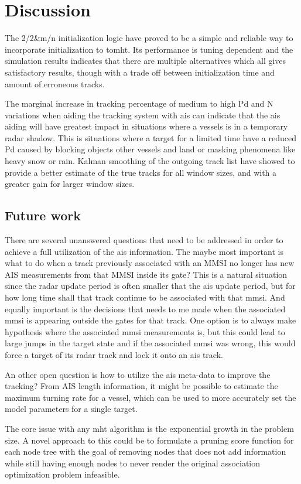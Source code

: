
\chapter{Discussion}\label{chapter:discussion}
The 2/2\&m/n initialization logic have proved to be a simple and reliable way to incorporate initialization to \gls{tomht}. Its performance is tuning dependent and the simulation results indicates that there are multiple alternatives which all gives satisfactory results, though with a trade off between initialization time and amount of erroneous tracks.

The marginal increase in tracking percentage of medium to high \gls{Pd} and N variations when aiding the tracking system with \gls{ais} can indicate that the \gls{ais} aiding will have greatest impact in situations where a vessels is in a temporary radar shadow. This is situations where a target for a limited time have a reduced \gls{Pd} caused by blocking objects other vessels and land or masking phenomena like heavy snow or rain. Kalman smoothing of the outgoing track list have showed to provide a better estimate of the true tracks for all window sizes, and with a greater gain for larger window sizes. 



\section{Future work}\label{sec:future-work}
There are several unanswered questions that need to be addressed in order to achieve a full utilization of the \gls{ais} information. The maybe most important is what to do when a track previously associated with an MMSI no longer has new AIS measurements from that MMSI inside its gate? This is a natural situation since the radar update period is often smaller that the \gls{ais} update period, but for how long time shall that track continue to be associated with that \gls{mmsi}. And equally important is the decisions that needs to me made when the associated \gls{mmsi} is appearing outside the gates for that track. One option is to always make hypothesis where the associated \gls{mmsi} measurements is, but this could lead to large jumps in the target state and if the associated \gls{mmsi} was wrong, this would force a target of its radar track and lock it onto an \gls{ais} track.

An other open question is how to utilize the \gls{ais} meta-data to improve the tracking? From AIS length information, it might be possible to estimate the maximum turning rate for a vessel, which can be used to more accurately set the model parameters for a single target.

The core issue with any \gls{mht} algorithm is the exponential growth in the problem size. A novel approach to this could be to formulate a pruning score function for each node tree with the goal of removing nodes that does not add information while still having enough nodes to never render the original association optimization problem infeasible.